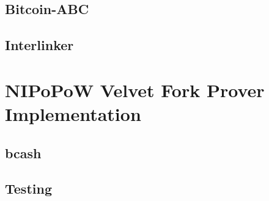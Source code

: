 \documentclass[11pt]{llncs}
\begin{document}
\subsection{Bitcoin-ABC}
\subsection{Interlinker}

\section{NIPoPoW Velvet Fork Prover Implementation}

\subsection{bcash}
\subsection{Testing}


\end{document}
